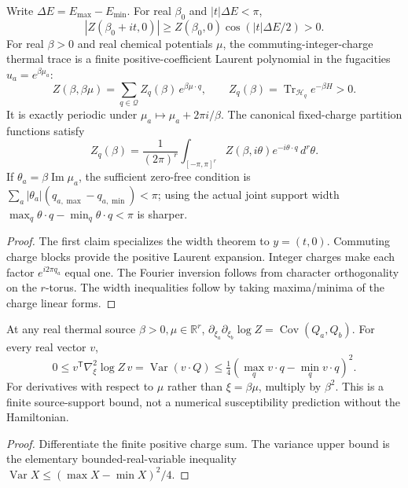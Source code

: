 \documentclass[12pt,a4paper]{article}
\begin{document}
\begin{corollary}
\label{p11:cor:cc13-fugacity-strips}
Write $\Delta E=E_{\max}-E_{\min}$.
For real $\beta_0$ and $|t|\Delta E<\pi$,
\[
 |Z(\beta_0+it,0)|\ge
 Z(\beta_0,0)\cos(|t|\Delta E/2)>0.
\]
For real $\beta>0$ and real chemical potentials $\mu$, the
commuting-integer-charge thermal trace is a finite positive-coefficient
Laurent polynomial in the fugacities $u_a=e^{\beta\mu_a}$:
\[
 \boxed{Z(\beta,\beta\mu)=
 \sum_{q\in\mathcal Q}Z_q(\beta)\,e^{\beta\mu\cdot q},\qquad
 Z_q(\beta)=\operatorname{Tr}_{\mathscr H_q}e^{-\beta H}>0.}
\]
It is exactly periodic under $\mu_a\mapsto\mu_a+2\pi i/\beta$.
The canonical fixed-charge partition functions satisfy
\[
 Z_q(\beta)=\frac1{(2\pi)^r}\int_{[-\pi,\pi]^r}
 Z(\beta,i\theta)e^{-i\theta\cdot q}\,d^r\theta.
\]
If $\theta_a=\beta\operatorname{Im}\mu_a$, the sufficient
zero-free condition is
$\sum_a|\theta_a|(q_{a,\max}-q_{a,\min})<\pi$;
using the actual joint support width
$\max_q\theta\cdot q-\min_q\theta\cdot q<\pi$ is sharper.
\end{corollary}
\begin{proof}
The first claim specializes the width theorem to $y=(t,0)$.
Commuting charge blocks provide the positive Laurent expansion.
Integer charges make each factor $e^{i2\pi q_a}$ equal one.
The Fourier inversion follows from character orthogonality on the
$r$-torus.  The width inequalities follow by taking maxima/minima of
the charge linear forms.
\end{proof}

\begin{corollary}
\label{p11:cor:cc13-charge-variance}
At any real thermal source $\beta>0,\mu\in\mathbb R^r$,
$\partial_{\xi_a}\partial_{\xi_b}\log Z
=\operatorname{Cov}(Q_a,Q_b)$.  For every real vector $v$,
\[
 \boxed{0\le v^{\mathsf T}\nabla_\xi^2\log Z\,v
 =\operatorname{Var}(v\cdot Q)
 \le \tfrac14\left(\max_qv\cdot q-\min_qv\cdot q\right)^2.}
\]
For derivatives with respect to $\mu$ rather than $\xi=\beta\mu$,
multiply by $\beta^2$.  This is a finite source-support bound,
not a numerical susceptibility prediction without the Hamiltonian.
\end{corollary}
\begin{proof}
Differentiate the finite positive charge sum.  The variance upper
bound is the elementary bounded-real-variable inequality
$\operatorname{Var} X\le (\max X-\min X)^2/4$.
\end{proof}
\end{document}

